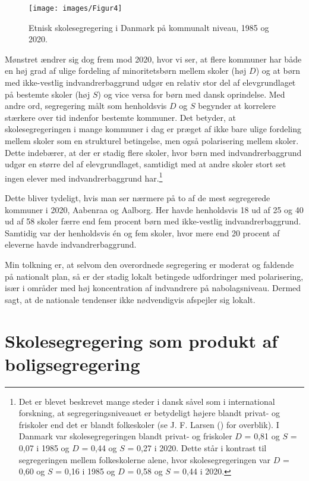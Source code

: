 \documentclass[
]{book}
\begin{document}
\begin{figure}
\texttt{[image: images/Figur4]} \caption{Etnisk skolesegregering i Danmark på kommunalt niveau, 1985 og 2020.}\label{fig:fig-4-3}
\end{figure}

\newpage

Mønstret ændrer sig dog frem mod 2020, hvor vi ser, at flere kommuner har både en høj grad af ulige fordeling af minoritetsbørn mellem skoler (høj \(D\)) og at børn med ikke-vestlig indvandrerbaggrund udgør en relativ stor del af elevgrundlaget på bestemte skoler (høj \(S\)) og vice versa for børn med dansk oprindelse. Med andre ord, segregering målt som henholdsvis \(D\) og \(S\) begynder at korrelere stærkere over tid indenfor bestemte kommuner. Det betyder, at skolesegregeringen i mange kommuner i dag er præget af ikke bare ulige fordeling mellem skoler som en strukturel betingelse, men også polarisering mellem skoler. Dette indebærer, at der er stadig flere skoler, hvor børn med indvandrerbaggrund udgør en større del af elevgrundlaget, samtidigt med at andre skoler stort set ingen elever med indvandrerbaggrund har.\footnote{Det er blevet beskrevet mange steder i dansk såvel som i international forskning, at segregeringsniveauet er betydeligt højere blandt privat- og friskoler end det er blandt folkeskoler (se J. F. Larsen () for overblik). I Danmark var skolesegregeringen blandt privat- og friskoler \(D\) = 0,81 og \(S\) = 0,07 i 1985 og \(D\) = 0,44 og \(S\) = 0,27 i 2020. Dette står i kontrast til segregeringen mellem folkeskolerne alene, hvor skolesegregeringen var \(D\) = 0,60 og \(S\) = 0,16 i 1985 og \(D\) = 0,58 og \(S\) = 0,44 i 2020.}

Dette bliver tydeligt, hvis man ser nærmere på to af de mest segregerede kommuner i 2020, Aabenraa og Aalborg. Her havde henholdsvis 18 ud af 25 og 40 ud af 58 skoler færre end fem procent børn med ikke-vestlig indvandrerbaggrund. Samtidig var der henholdsvis én og fem skoler, hvor mere end 20 procent af eleverne havde indvandrerbaggrund.

Min tolkning er, at selvom den overordnede segregering er moderat og faldende på nationalt plan, så er der stadig lokalt betingede udfordringer med polarisering, især i områder med høj koncentration af indvandrere på nabolagsniveau. Dermed sagt, at de nationale tendenser ikke nødvendigvis afspejler sig lokalt.

\section{Skolesegregering som produkt af boligsegregering}\label{skolesegregering-som-produkt-af-boligsegregering}
\end{document}
